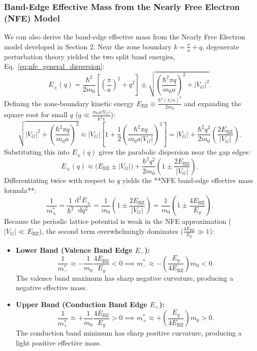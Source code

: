\documentclass[11pt,a4paper]{article}
\newcommand{\abs}[1]{\left|#1\right|}
\newcommand{\dvtwo}[2]{\frac{\mathrm{d}^2#1}{\mathrm{d}#2^2}}
\newcommand{\hb}{\hbar}
\newcommand{\hbarsq}{\hb^2}
\newcommand{\BZ}{\text{BZ}}
\begin{document}
\subsubsection{Band-Edge Effective Mass from the Nearly Free Electron (NFE) Model}
We can also derive the band-edge effective mass from the Nearly Free Electron model developed in Section 2. Near the zone boundary $k = \frac{\pi}{a} + q$, degenerate perturbation theory yielded the two split band energies, Eq.~\eqref{eq:nfe_general_dispersion}:
\begin{equation}
    E_\pm(q) = \frac{\hbarsq}{2m_0}\left[\left(\frac{\pi}{a}\right)^2 + q^2\right] \pm \sqrt{\left(\frac{\hbarsq \pi q}{m_0 a}\right)^2 + \abs{V_G}^2}.
\end{equation}
Defining the zone-boundary kinetic energy $E_{\BZ} \equiv \frac{\hbarsq(\pi/a)^2}{2m_0}$ and expanding the square root for small $q$ ($q \ll \frac{m_0 a \abs{V_G}}{\hb^2 \pi}$):
\begin{equation}
    \sqrt{\abs{V_G}^2 + \left(\frac{\hbarsq \pi q}{m_0 a}\right)^2} \approx \abs{V_G}\left[1 + \frac{1}{2}\left(\frac{\hbarsq \pi q}{m_0 a \abs{V_G}}\right)^2\right] = \abs{V_G} + \frac{\hbarsq q^2}{2m_0}\left(\frac{2E_{\BZ}}{\abs{V_G}}\right).
\end{equation}
Substituting this into $E_\pm(q)$ gives the parabolic dispersion near the gap edges:
\begin{equation}
    E_\pm(q) \approx \big(E_{\BZ} \pm \abs{V_G}\big) + \frac{\hbarsq q^2}{2m_0}\left(1 \pm \frac{2E_{\BZ}}{\abs{V_G}}\right).
\end{equation}
Differentiating twice with respect to $q$ yields the **NFE band-edge effective mass formula**:
\begin{equation}
    \boxed{\frac{1}{m_\pm^*} = \frac{1}{\hbarsq}\dvtwo{E_\pm}{q} = \frac{1}{m_0}\left(1 \pm \frac{2E_{\BZ}}{\abs{V_G}}\right) = \frac{1}{m_0}\left(1 \pm \frac{4E_{\BZ}}{E_g}\right).}
    \label{eq:nfe_mstar_formula_detailed}
\end{equation}
Because the periodic lattice potential is weak in the NFE approximation ($\abs{V_G} \ll E_{\BZ}$), the second term overwhelmingly dominates ($\frac{4E_{\BZ}}{E_g} \gg 1$):
\begin{itemize}
    \item \textbf{Lower Band (Valence Band Edge $E_-$):}
    \begin{equation}
        \frac{1}{m_-^*} \approx -\frac{1}{m_0}\frac{4E_{\BZ}}{E_g} < 0 \implies m_-^* \approx -\left(\frac{E_g}{4E_{\BZ}}\right)m_0 < 0.
    \end{equation}
    The valence band maximum has sharp negative curvature, producing a negative effective mass.
    \item \textbf{Upper Band (Conduction Band Edge $E_+$):}
    \begin{equation}
        \frac{1}{m_+^*} \approx +\frac{1}{m_0}\frac{4E_{\BZ}}{E_g} > 0 \implies m_+^* \approx +\left(\frac{E_g}{4E_{\BZ}}\right)m_0 > 0.
    \end{equation}
    The conduction band minimum has sharp positive curvature, producing a light positive effective mass.
\end{itemize}
\end{document}
